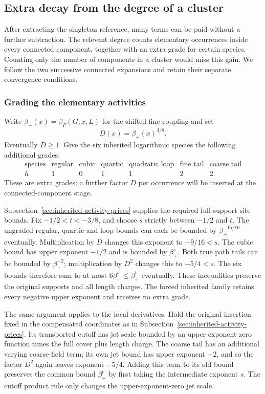 \subsection{Extra decay from the degree of a cluster}
\label{sec:high-degree-cluster-prices}
After extracting the singleton reference, many terms can be paid
without a further subtraction. The relevant degree counts elementary
occurrences inside every connected component, together with an extra
grade for certain species. Counting only the number of components
in a cluster would miss this gain. We follow the two successive
connected expansions and retain their separate convergence conditions.

\subsubsection{Grading the elementary activities}
Write $\beta_+(x)=\beta_F(G,x,L)$ for the shifted fine coupling and set
\[
                         D(x)=\beta_+(x)^{3/8}.
\]
Eventually $D\ge1$. Give the six inherited logarithmic species the
following additional grades:
\[
\begin{array}{c|rrrrrr}
\text{species}&\text{regular}&\text{cubic}&\text{quartic}
 &\text{quadratic loop}&\text{fine tail}&\text{coarse tail}\\\hline
 h&1&0&1&1&2&2.
\end{array}
\]
These are extra grades; a further factor $D$ per occurrence will
be inserted at the connected-component stage.

Subsection~\ref{sec:inherited-activity-prices} supplies the required
full-support site bounds. Fix $-1/2<t<-3/8$, and choose $s$ strictly
between $-1/2$ and $t$. The ungraded regular, quartic and loop bounds
can each be bounded by $\beta_+^{-15/16}$ eventually. Multiplication
by $D$ changes this exponent to $-9/16<s$. The cubic bound has upper
exponent $-1/2$ and is bounded by $\beta_+^s$. Both true path tails
can be bounded by $\beta_+^{-2}$; multiplication by $D^2$ changes this
to $-5/4<s$. The six bounds therefore sum to at most
$6\beta_+^s\le\beta_+^t$ eventually. These inequalities preserve the
original supports and all length charges. The forced inherited family
retains every negative upper exponent and receives no extra grade.

The same argument applies to the local derivatives. Hold the original
insertion fixed in the compensated coordinates as in
Subsection~\ref{sec:inherited-activity-prices}. Its transported cutoff has
jet scale bounded by an upper-exponent-zero function times the full
cover plus length charge. The coarse tail has an additional varying
coarse-field term; its own jet bound has upper exponent $-2$, and so
the factor $D^2$ again leaves exponent $-5/4$. Adding this term to its
old bound preserves the common bound $\beta_+^t$ by first taking the
intermediate exponent $s$. The cutoff product rule only changes the
upper-exponent-zero jet scale.

